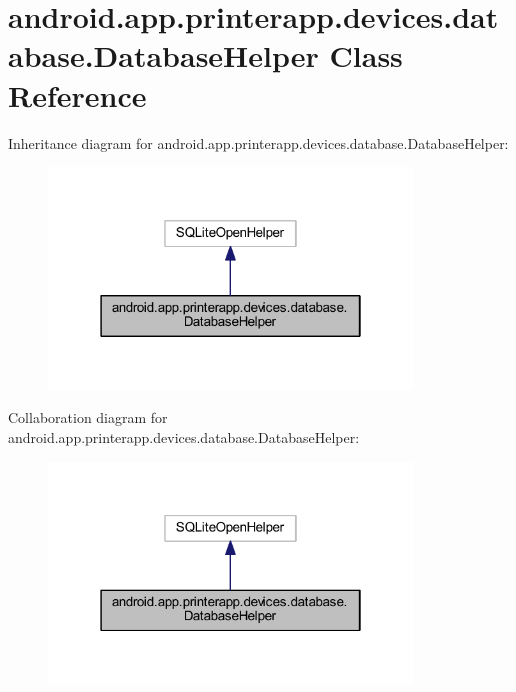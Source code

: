 \hypertarget{classandroid_1_1app_1_1printerapp_1_1devices_1_1database_1_1_database_helper}{}\section{android.\+app.\+printerapp.\+devices.\+database.\+Database\+Helper Class Reference}
\label{classandroid_1_1app_1_1printerapp_1_1devices_1_1database_1_1_database_helper}


Inheritance diagram for android.\+app.\+printerapp.\+devices.\+database.\+Database\+Helper\+:
\nopagebreak
\begin{figure}[H]
\begin{center}
\leavevmode
\includegraphics[width=274pt]{classandroid_1_1app_1_1printerapp_1_1devices_1_1database_1_1_database_helper__inherit__graph}
\end{center}
\end{figure}


Collaboration diagram for android.\+app.\+printerapp.\+devices.\+database.\+Database\+Helper\+:
\nopagebreak
\begin{figure}[H]
\begin{center}
\leavevmode
\includegraphics[width=274pt]{classandroid_1_1app_1_1printerapp_1_1devices_1_1database_1_1_database_helper__coll__graph}
\end{center}
\end{figure}

